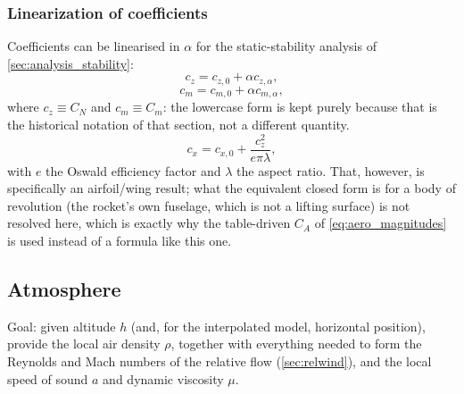 \subsubsection{Linearization of coefficients}
Coefficients can be linearised in $\alpha$ for the static-stability analysis of
\autoref{sec:analysis_stability}:
\begin{equation}
    c_z = c_{z,0} + \alpha c_{z,\alpha},
\end{equation}
\begin{equation}
    c_m = c_{m,0} + \alpha c_{m,\alpha},
\end{equation}
where $c_z\equiv C_N$ and $c_m\equiv C_m$: the lowercase form is kept purely because that is the
historical notation of that section, not a different quantity.
\begin{equation}
    c_x = c_{x,0} + \frac{c_z^2}{e\pi\lambda},
\end{equation}
with $e$ the Oswald efficiency factor and $\lambda$ the aspect ratio. That, however, is
specifically an airfoil/wing result; what the equivalent closed form is for a body of revolution
(the rocket's own fuselage, which is not a lifting surface) is not resolved here, which is exactly
why the table-driven $C_A$ of \autoref{eq:aero_magnitudes} is used instead of a formula like this
one.

\subsection{Atmosphere}\label{sec:atmosphere}
Goal: given altitude $h$ (and, for the interpolated model, horizontal position), provide the local
air density $\rho$, together with everything needed to form the Reynolds and Mach numbers of the
relative flow (\autoref{sec:relwind}), and the local speed of sound $a$ and dynamic viscosity
$\mu$.

